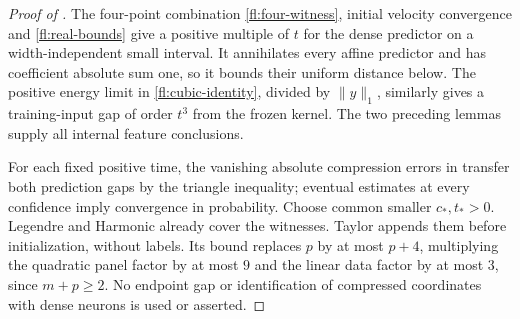 \begin{proof}[Proof of ]
The four-point combination \eqref{fl:four-witness}, initial velocity
convergence and \eqref{fl:real-bounds} give a positive multiple of $t$
for the dense predictor on a width-independent small interval.
It annihilates every affine predictor and has coefficient absolute sum one,
so it bounds their uniform distance below. The positive energy limit in
\eqref{fl:cubic-identity}, divided by $\|y\|_1$, similarly gives a
training-input gap of order $t^3$ from the frozen kernel.
The two preceding lemmas supply all internal feature conclusions.

For each fixed positive time, the vanishing absolute compression errors
in  transfer both prediction gaps
by the triangle inequality; eventual estimates at every confidence imply
convergence in probability. Choose common smaller $c_*,t_*>0$.
Legendre and Harmonic already cover the witnesses. Taylor appends them
before initialization, without labels. Its bound replaces $p$ by at most
$p+4$, multiplying the quadratic panel factor by at most $9$ and the
linear data factor by at most $3$, since $m+p\ge2$.
No endpoint gap or identification of compressed coordinates with dense
neurons is used or asserted.
\end{proof}
